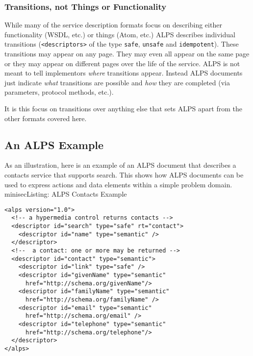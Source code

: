 \documentclass{wsrest2014}
\begin{document}
\subsubsection{Transitions, not Things or Functionality}
\label{_transitions_not_things_or_functionality}
 \par{}While many of the service description formats focus on describing either functionality (WSDL, etc.) or things (Atom, etc.) ALPS describes individual transitions (\texttt{\textless{}descriptors\textgreater{}} of the type \texttt{safe}, \texttt{unsafe} and \texttt{idempotent}). These transitions may appear on any page. They may even all appear on the same page or they may appear on different pages over the life of the service. ALPS is not meant to tell implementors \emph{where} transitions appear. Instead ALPS documents just indicate \emph{what} transitions are possible and \emph{how} they are completed (via parameters, protocol methods, etc.).
 \par{}It is this focus on transitions over anything else that sets ALPS apart from the other formats covered here.
\hypertarget{_an_alps_example}{}
\subsection{An ALPS Example}
\label{_an_alps_example}
 \par{}As an illustration, here is an example of an ALPS document that describes a contacts service that supports search. This shows how ALPS documents can be used to express actions and data elements within a simple problem domain.
\\minisec{Listing: ALPS Contacts Example}
\begin{verbatim}<alps version="1.0">
  <!-- a hypermedia control returns contacts -->
  <descriptor id="search" type="safe" rt="contact">
    <descriptor id="name" type="semantic" />
  </descriptor>
  <!--  a contact: one or more may be returned -->
  <descriptor id="contact" type="semantic">
    <descriptor id="link" type="safe" />
    <descriptor id="givenName" type="semantic"
      href="http://schema.org/givenName"/>
    <descriptor id="familyName" type="semantic"
      href="http://schema.org/familyName" />
    <descriptor id="email" type="semantic"
      href="http://schema.org/email" />
    <descriptor id="telephone" type="semantic"
      href="http://schema.org/telephone"/>
  </descriptor>
</alps>\end{verbatim}
\end{document}
